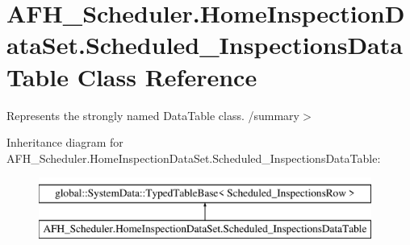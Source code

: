 \section{A\+F\+H\+\_\+\+Scheduler.\+Home\+Inspection\+Data\+Set.\+Scheduled\+\_\+\+Inspections\+Data\+Table Class Reference}
\label{class_a_f_h___scheduler_1_1_home_inspection_data_set_1_1_scheduled___inspections_data_table}


Represents the strongly named Data\+Table class. /summary$>$  


Inheritance diagram for A\+F\+H\+\_\+\+Scheduler.\+Home\+Inspection\+Data\+Set.\+Scheduled\+\_\+\+Inspections\+Data\+Table\+:\begin{figure}[H]
\begin{center}
\leavevmode
\includegraphics[height=2.000000cm]{class_a_f_h___scheduler_1_1_home_inspection_data_set_1_1_scheduled___inspections_data_table}
\end{center}
\end{figure}
